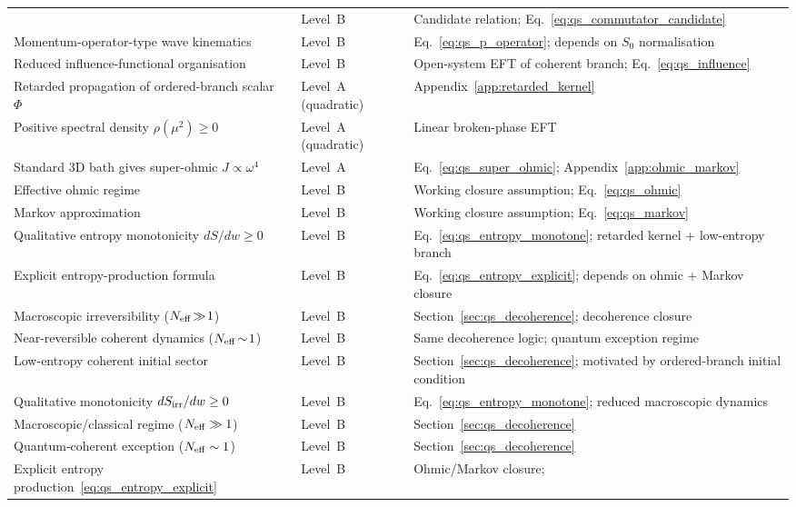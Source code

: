 \documentclass[11pt,a4paper]{article}
\numberwithin{equation}{section}
\begin{document}
{\begin{longtable}{p{6.0cm}p{2.4cm}p{4.5cm}}
  & Level~B
  & Candidate relation; Eq.~\eqref{eq:qs_commutator_candidate} \\
Momentum-operator-type wave kinematics
  & Level~B
  & Eq.~\eqref{eq:qs_p_operator}; depends on $S_0$ normalisation \\
Reduced influence-functional organisation
  & Level~B
  & Open-system EFT of coherent branch;
    Eq.~\eqref{eq:qs_influence} \\
Retarded propagation of ordered-branch scalar~$\Phi$
  & Level~A (quadratic)
  & Appendix~\ref{app:retarded_kernel} \\
Positive spectral density $\rho(\mu^2)\ge 0$
  & Level~A (quadratic)
  & Linear broken-phase EFT \\
Standard 3D bath gives super-ohmic $J\!\propto\!\omega^4$
  & Level~A
  & Eq.~\eqref{eq:qs_super_ohmic};
    Appendix~\ref{app:ohmic_markov} \\
Effective ohmic regime
  & Level~B
  & Working closure assumption; Eq.~\eqref{eq:qs_ohmic} \\
Markov approximation
  & Level~B
  & Working closure assumption; Eq.~\eqref{eq:qs_markov} \\
Qualitative entropy monotonicity $dS/dw\ge 0$
  & Level~B
  & Eq.~\eqref{eq:qs_entropy_monotone};
    retarded kernel + low-entropy branch \\
Explicit entropy-production formula
  & Level~B
  & Eq.~\eqref{eq:qs_entropy_explicit};
    depends on ohmic + Markov closure \\
Macroscopic irreversibility ($N_{\rm eff}\!\gg\!1$)
  & Level~B
  & Section~\ref{sec:qs_decoherence};
    decoherence closure \\
Near-reversible coherent dynamics ($N_{\rm eff}\!\sim\!1$)
  & Level~B
  & Same decoherence logic; quantum exception regime \\
Low-entropy coherent initial sector
  & Level~B
  & Section~\ref{sec:qs_decoherence};
    motivated by ordered-branch initial condition \\
Qualitative monotonicity $dS_{\rm irr}/dw\ge0$
  & Level~B
  & Eq.~\eqref{eq:qs_entropy_monotone};
    reduced macroscopic dynamics \\
Macroscopic/classical regime ($N_{\rm eff}\gg1$)
  & Level~B
  & Section~\ref{sec:qs_decoherence} \\
Quantum-coherent exception ($N_{\rm eff}\sim1$)
  & Level~B
  & Section~\ref{sec:qs_decoherence} \\
Explicit entropy production~\eqref{eq:qs_entropy_explicit}
  & Level~B
  & Ohmic/Markov closure;

\end{longtable}}
\end{document}
